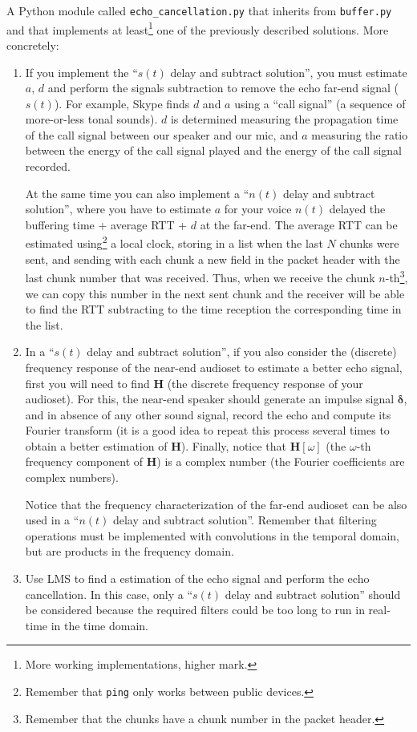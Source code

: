 A Python module called \texttt{echo\_cancellation.py} that inherits
from \texttt{buffer.py} and that implements at least\footnote{More
  working implementations, higher mark.} one of the previously
described solutions. More concretely:
\begin{enumerate}

\item If you implement the ``$s(t)$ delay and subtract solution'',
  you must estimate $a$, $d$ and perform the signals subtraction to
  remove the echo far-end signal ($s(t)$). For example, Skype finds
  $d$ and $a$ using a ``call signal'' (a sequence of more-or-less
  tonal sounds). $d$ is determined measuring the propagation time of
  the call signal between our speaker and our mic, and $a$ measuring
  the ratio between the energy of the call signal played and the
  energy of the call signal recorded.

  At the same time you can also implement a ``$n(t)$ delay and
  subtract solution'', where you have to estimate $a$ for your voice
  $n(t)$ delayed the buffering time + average RTT + $d$ at the
  far-end. The average RTT can be estimated using\footnote{Remember
    that \texttt{ping} only works between public devices.} a local
  clock, storing in a list when the last $N$ chunks were sent, and
  sending with each chunk a new field in the packet header with the
  last chunk number that was received. Thus, when we receive the chunk
  $n$-th\footnote{Remember that the chunks have a chunk number in the
    packet header.}, we can copy this number in the next sent chunk
  and the receiver will be able to find the RTT subtracting to the
  time reception the corresponding time in the list.

\item In a ``$s(t)$ delay and subtract solution'', if you also
  consider the (discrete) frequency response of the near-end audioset
  to estimate a better echo signal, first you will need to find
  ${\mathbf H}$ (the discrete frequency response of your
  audioset). For this, the near-end speaker should generate an impulse
  signal ${\mathbf \delta}$, and in absence of any other sound signal,
  record the echo and compute its Fourier transform (it is a good idea
  to repeat this process several times to obtain a better estimation
  of ${\mathbf H}$). Finally, notice that ${\mathbf H}[\omega]$ (the
  $\omega$-th frequency component of ${\mathbf H}$) is a complex
  number (the Fourier coefficients are complex numbers).

  Notice that the frequency characterization of the far-end audioset
  can be also used in a ``$n(t)$ delay and subtract
  solution''. Remember that filtering operations must be implemented
  with convolutions in the temporal domain, but are products in the
  frequency domain.
  
\item Use LMS to find a estimation of the echo signal and perform the
  echo cancellation. In this case, only a ``$s(t)$ delay and subtract
  solution'' should be considered because the required filters could
  be too long to run in real-time in the time domain.
\end{enumerate}

